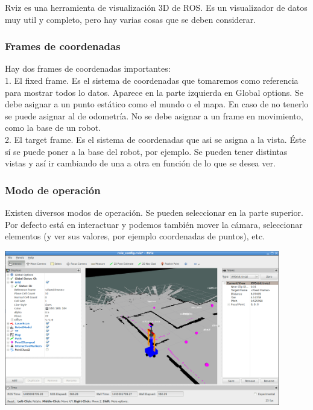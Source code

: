 \documentclass[user_manual.tex]{subfiles}
\begin{document}
Rviz es una herramienta de visualización 3D de ROS. Es un visualizador de datos muy util y completo, pero hay varias cosas que se deben considerar.

\subsubsection{Frames de coordenadas}

Hay dos frames de coordenadas importantes:\\

  1.  El fixed frame. Es el sistema de coordenadas que tomaremos como referencia para mostrar todos lo datos. Aparece en la parte izquierda en Global options. Se debe asignar a un punto estático como el mundo o el mapa. En caso de no tenerlo se puede asignar al de odometría. No se debe asignar a un frame en movimiento, como la base de un robot.\\
  
  2.  El target frame.  Es el sistema de coordenadas que asi se asigna a la vista. Éste sí se puede poner a la base del robot, por ejemplo. Se pueden tener distintas vistas y así ir cambiando de una a otra en función de lo que se desea ver.

\subsubsection{Modo de operación}

Existen diversos modos de operación. Se pueden seleccionar en la parte superior. Por defecto está en interactuar y podemos también mover la cámara, seleccionar elementos (y ver sus valores, por ejemplo coordenadas de puntos), etc.

\begin{center}
\includegraphics[width=0.9\textwidth]{Figures/Puesta_marcha/RViz.png}
\end{center}
\end{document}
